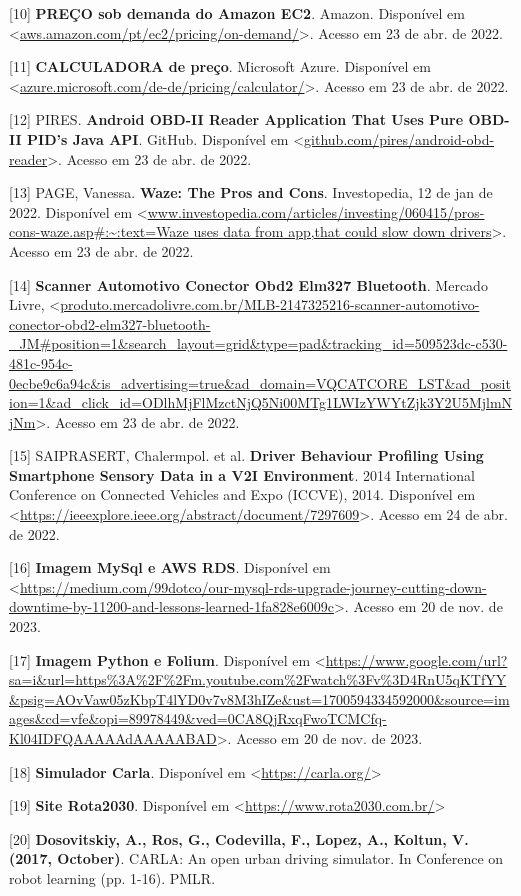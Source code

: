 [10] \textbf{PREÇO sob demanda do Amazon EC2}. Amazon. Disponível em <\url{aws.amazon.com/pt/ec2/pricing/on-demand/}>. Acesso em 23 de abr. de 2022.


[11] \textbf{CALCULADORA de preço}. Microsoft Azure. Disponível em <\url{azure.microsoft.com/de-de/pricing/calculator/}>. Acesso em 23 de abr. de 2022.

[12] PIRES. \textbf{Android OBD-II Reader Application That Uses Pure OBD-II PID's Java API}. GitHub. Disponível em <\url{github.com/pires/android-obd-reader}>. Acesso em 23 de abr. de 2022.

[13] PAGE, Vanessa. \textbf{Waze: The Pros and Cons}. Investopedia, 12 de jan de 2022. Disponível em <\url{www.investopedia.com/articles/investing/060415/pros-cons-waze.asp#:~:text=Waze uses data from app,that could slow down drivers}>. Acesso em 23 de abr. de 2022.


[14] \textbf{Scanner Automotivo Conector Obd2 Elm327 Bluetooth}. Mercado Livre, <\url{produto.mercadolivre.com.br/MLB-2147325216-scanner-automotivo-conector-obd2-elm327-bluetooth-_JM#position=1&search_layout=grid&type=pad&tracking_id=509523dc-c530-481c-954c-0ecbe9c6a94c&is_advertising=true&ad_domain=VQCATCORE_LST&ad_position=1&ad_click_id=ODlhMjFlMzctNjQ5Ni00MTg1LWIzYWYtZjk3Y2U5MjlmNjNm}>. Acesso em 23 de abr. de 2022.

[15] SAIPRASERT, Chalermpol. et al. \textbf{Driver Behaviour Profiling Using Smartphone Sensory Data in a V2I Environment}. 2014 International Conference on Connected Vehicles and Expo (ICCVE), 2014. Disponível em <\url{https://ieeexplore.ieee.org/abstract/document/7297609}>. Acesso em 24 de abr. de 2022.

[16] \textbf{Imagem MySql e AWS RDS}. Disponível em <\url{https://medium.com/99dotco/our-mysql-rds-upgrade-journey-cutting-down-downtime-by-11200-and-lessons-learned-1fa828e6009c}>. Acesso em 20 de nov. de 2023.

[17] \textbf{Imagem Python e Folium}. Disponível em <\url{https://www.google.com/url?sa=i&url=https%3A%2F%2Fm.youtube.com%2Fwatch%3Fv%3D4RnU5qKTfYY&psig=AOvVaw05zKbpT4lYD0v7v8M3hIZe&ust=1700594334592000&source=images&cd=vfe&opi=89978449&ved=0CA8QjRxqFwoTCMCfq-Kl04IDFQAAAAAdAAAAABAD}>. Acesso em 20 de nov. de 2023.

[18] \textbf{Simulador Carla}. Disponível em <\url{https://carla.org/}>

[19] \textbf{Site Rota2030}. Disponível em <\url{https://www.rota2030.com.br/}>

[20] \textbf{Dosovitskiy, A., Ros, G., Codevilla, F., Lopez, A., Koltun, V. (2017, October)}. CARLA: An open urban driving simulator. In Conference on robot learning (pp. 1-16). PMLR.

